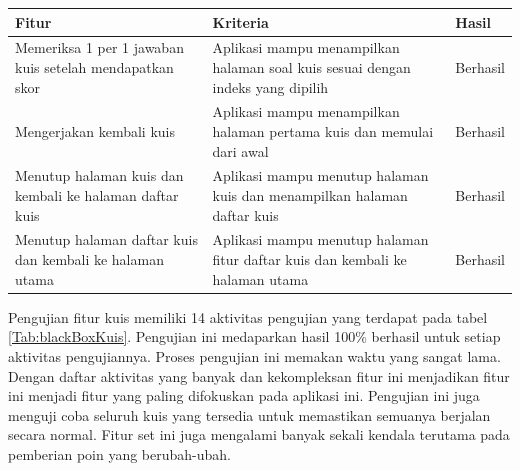 \begin{table}[H]
	\begin{tabular}{|p{}|p{}|p{}|}
		\hline
		 \centering\textbf{Fitur} & \multicolumn{1}{m{0.45\textwidth}|}{\centering \textbf{Kriteria}}&  \multicolumn{1}{m{0.1\textwidth}|}{\centering \textbf{Hasil}}\\
		 \hline
		Memeriksa 1 per 1 jawaban kuis setelah mendapatkan skor
		& Aplikasi mampu menampilkan halaman soal kuis sesuai dengan indeks yang dipilih 
		& Berhasil\\
		\hline
		Mengerjakan kembali kuis
		& Aplikasi mampu menampilkan halaman pertama kuis dan memulai dari awal
		& Berhasil\\
		\hline
		Menutup halaman kuis dan kembali ke halaman daftar kuis
		& Aplikasi mampu menutup halaman kuis dan menampilkan halaman daftar kuis
		& Berhasil\\
		\hline
		Menutup halaman daftar kuis dan kembali ke halaman utama
		& Aplikasi mampu menutup halaman fitur daftar kuis dan kembali ke halaman utama 
		& Berhasil\\
		\hline
	\end{tabular}
\end{table}
Pengujian fitur kuis memiliki 14 aktivitas pengujian yang terdapat pada tabel \ref*{Tab:blackBoxKuis}.
Pengujian ini medaparkan hasil 100\% berhasil untuk setiap aktivitas pengujiannya. Proses pengujian ini memakan waktu yang sangat lama.
Dengan daftar aktivitas yang banyak dan kekompleksan fitur ini menjadikan fitur ini menjadi fitur yang paling difokuskan pada aplikasi ini.
Pengujian ini juga menguji coba seluruh kuis yang tersedia untuk memastikan semuanya berjalan secara normal.
Fitur set ini juga mengalami banyak sekali kendala terutama pada pemberian poin yang berubah-ubah. 
\newpage

